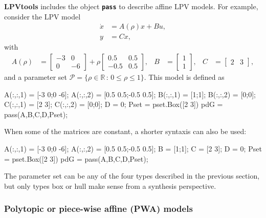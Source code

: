 \documentclass[fleqn,11pt]{article}
\newcommand{\lcode}[1]{\textbf{%
    \lstinline[style=mystyle]{#1}}}
\newcommand{\p}{\rho}
\newcommand{\Rset}{\mathbb{R}}
\newcommand{\Pset}{\mathcal{P}}
\newcommand{\lpvtool}{\textbf{LPVtools}\xspace}
\begin{document}
\lpvtool includes the object \lcode{pass} to describe affine LPV models. For example, consider the LPV model
\begin{align*}
    \dot{x} &= A(\p)x+Bu,\\
    y &= Cx,
\end{align*}
with
\begin{align*}
    A(\p) &= \begin{bmatrix}
                -3 & 0 \\
                 0 & -6
            \end{bmatrix} + \p
            \begin{bmatrix}
                0.5 & 0.5 \\
               -0.5 & 0.5
            \end{bmatrix},&
    B &= \begin{bmatrix}
          1 \\ 1
        \end{bmatrix},&
    C &= \begin{bmatrix}
          2 & 3
        \end{bmatrix},
\end{align*}
and a parameter set $\Pset = \{\p\in\Rset\,:\,0\leq\p\leq 1\}$. This model is defined as
\begin{code}
A(:,:,1) = [-3 0;0 -6];
A(:,:,2) = [0.5 0.5;-0.5 0.5];
B(:,:,1) = [1;1];
B(:,:,2) = [0;0];
C(:,:,1) = [2 3];
C(:,:,2) = [0;0];
D        = 0;
Pset = pset.Box([2 3])
pdG = pass(A,B,C,D,Pset);
\end{code}
When some of the matrices are constant, a shorter syntaxis can also be used:
\begin{code}
A(:,:,1) = [-3 0;0 -6];
A(:,:,2) = [0.5 0.5;-0.5 0.5];
B        = [1;1];
C        = [2 3];
D        = 0;
Pset = pset.Box([2 3])
pdG = pass(A,B,C,D,Pset);
\end{code}

The parameter set can be any of the four types described in the previous section, but only types box or hull make sense from a synthesis perspective.

\subsubsection{Polytopic or piece-wise affine (PWA) models}\label{sssec:sysPpss}
\end{document}
